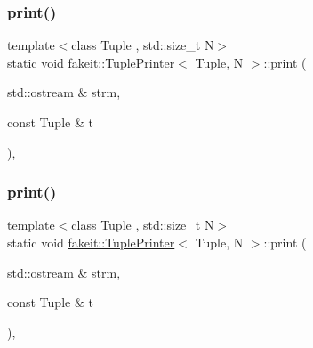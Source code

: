\subsubsection{\texorpdfstring{print()}{print()}\hspace{0.1cm}{\footnotesize\ttfamily [7/9]}}
{\footnotesize\ttfamily template$<$class Tuple , std\+::size\+\_\+t N$>$ \\
static void \mbox{\hyperlink{structfakeit_1_1TuplePrinter}{fakeit\+::\+Tuple\+Printer}}$<$ Tuple, N $>$\+::print (\begin{DoxyParamCaption}\item[{std\+::ostream \&}]{strm,  }\item[{const Tuple \&}]{t }\end{DoxyParamCaption})\hspace{0.3cm}{\ttfamily [inline]}, {\ttfamily [static]}}

\mbox{\label{structfakeit_1_1TuplePrinter_a1c46b4cc8914280abd0f6a83a56db9b9}} 
\subsubsection{\texorpdfstring{print()}{print()}\hspace{0.1cm}{\footnotesize\ttfamily [8/9]}}
{\footnotesize\ttfamily template$<$class Tuple , std\+::size\+\_\+t N$>$ \\
static void \mbox{\hyperlink{structfakeit_1_1TuplePrinter}{fakeit\+::\+Tuple\+Printer}}$<$ Tuple, N $>$\+::print (\begin{DoxyParamCaption}\item[{std\+::ostream \&}]{strm,  }\item[{const Tuple \&}]{t }\end{DoxyParamCaption})\hspace{0.3cm}{\ttfamily [inline]}, {\ttfamily [static]}}

\mbox{\label{structfakeit_1_1TuplePrinter_a1c46b4cc8914280abd0f6a83a56db9b9}} 
